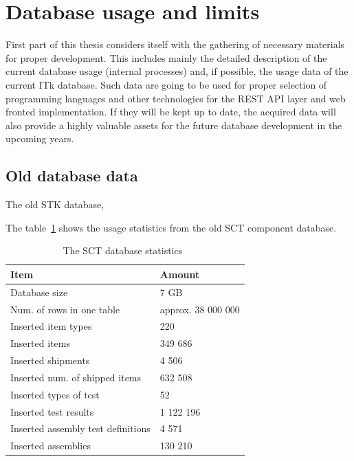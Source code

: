 \section{Database usage and limits}
\label{sec:databaseUsage}
\par First part of this thesis considers itself with the gathering of necessary materials for proper development. This includes mainly the detailed description of the current database usage (internal processes) and, if possible, the usage data of the current ITk database. Such data are going to be used for proper selection of programming languages and other technologies for the REST API layer and web fronted implementation. If they will be kept up to date, the acquired data will also provide a highly valuable assets for the future database development in the upcoming years.


\subsection{Old database data}
\par The old STK database, 

The table~\ref{tab:sctUsage} shows the usage statistics from the old SCT component database.

\begin {table}[H]
\begin{center}
	\caption{The SCT database statistics~\cite[slide 4]{cambridgeSctPresentation}}
	\label{tab:sctUsage} 
	
    \begin{tabular}{ | l | l |}
    \hline
    Item & Amount \\ \hline
	Database size & 7 GB\\ \hline
	Num. of rows in one table & approx. 38 000 000\\ \hline
	Inserted item types & 220 \\ \hline
	Inserted items & 349 686\\ \hline
	Inserted shipments & 4 506\\ \hline
	Inserted num. of shipped items & 632 508 \\ \hline
	Inserted types of test & 52\\ \hline
	Inserted test results & 1 122 196\\ \hline
	Inserted assembly test definitions & 4 571\\ \hline
	Inserted assemblies & 130 210\\ \hline

    \end{tabular}

\end{center}
\end{table}
    

